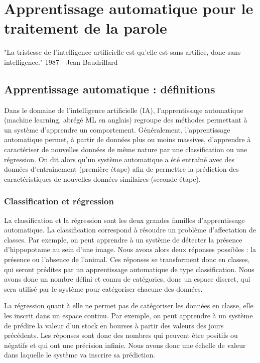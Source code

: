 \chapter{Apprentissage automatique pour le traitement de la parole}
"La tristesse de l'intelligence artificielle est qu'elle est sans artifice, donc sans intelligence." 1987 -
Jean Baudrillard

\section{Apprentissage automatique : définitions}

Dans le domaine de l'intelligence artificielle (IA), l'apprentissage automatique (machine learning, abrégé ML en anglais) regroupe des méthodes permettant à un système d'apprendre un comportement. Généralement, l'apprentissage automatique permet, à partir de données plus ou moins massives, d'apprendre à caractériser de nouvelles données de même nature par une classification ou une régression. On dit alors qu'un système automatique a été entraîné avec des données d’entraînement (première étape) afin de permettre la prédiction des caractéristiques de nouvelles données similaires (seconde étape).

\subsection{Classification et régression}
La classification et la régression sont les deux grandes familles d'apprentissage automatique.
La classification correspond à résoudre un problème d'affectation de classes. Par exemple, on peut apprendre à un système de détecter la présence d'hippopotame au sein d'une image. Nous avons alors deux réponses possibles : la présence ou l'absence de l'animal. Ces réponses se transforment donc en classes, qui seront prédites par un apprentissage automatique de type classification. Nous avons donc un nombre défini et connu de catégories, donc un espace discret, qui sera utilisé par le système pour catégoriser chacune des données.

La régression quant à elle ne permet pas de catégoriser les données en classe, elle les inscrit dans un espace continu. Par exemple, on peut apprendre à un système de prédire la valeur d'un stock en bourses à partir des valeurs des jours précédents. Les réponses sont donc des nombres qui peuvent être positifs ou négatifs et qui ont une précision infinie. Nous avons donc une échelle de valeur dans laquelle le système va inscrire sa prédiction.

